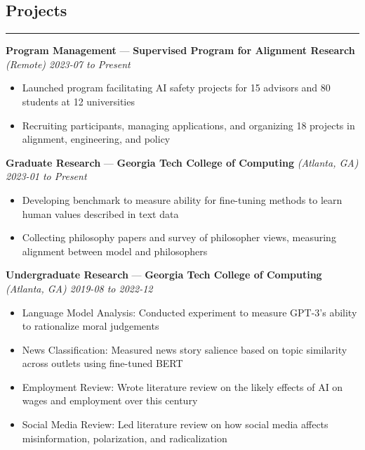 \documentclass[10pt]{article}
\newcommand{\resumeHeading}[1]{
    \subsection*{#1}
    \hrule
    \vspace*{5pt}
}
\newcommand{\resumeSubHeading}[5]{
    \vspace*{5pt}
    \textbf{#1} — \textbf{#2} \textsl{(#3) \hfill #4 to #5}
}
\begin{document}

\resumeHeading{Projects \vspace{-2.5pt}}

\resumeSubHeading
    {Program Management}
    {Supervised Program for Alignment Research}
    {Remote}
    {2023-07}
    {Present}
\begin{itemize}
    \item Launched program facilitating AI safety projects for 15 advisors and 80 students at 12 universities
    \item Recruiting participants, managing applications, and organizing 18 projects in alignment, engineering, and policy
\end{itemize}


\resumeSubHeading
    {Graduate Research}
    {Georgia Tech College of Computing}
    {Atlanta, GA}
    {2023-01}
    {Present}
\begin{itemize}
    \item Developing benchmark to measure ability for fine-tuning methods to learn human values described in text data
    \item Collecting philosophy papers and survey of philosopher views, measuring alignment between model and philosophers
\end{itemize}

\resumeSubHeading
    {Undergraduate Research}
    {Georgia Tech College of Computing}
    {Atlanta, GA}
    {2019-08}
    {2022-12}
\begin{itemize}
    \item Language Model Analysis:
    Conducted experiment to measure GPT-3's ability to rationalize moral judgements
    \item News Classification:
    Measured news story salience based on topic similarity across outlets using fine-tuned BERT
    \item Employment Review:
    Wrote literature review on the likely effects of AI on wages and employment over this century
    \item Social Media Review:
    Led literature review on how social media affects misinformation, polarization, and radicalization
\end{itemize}
\end{document}
